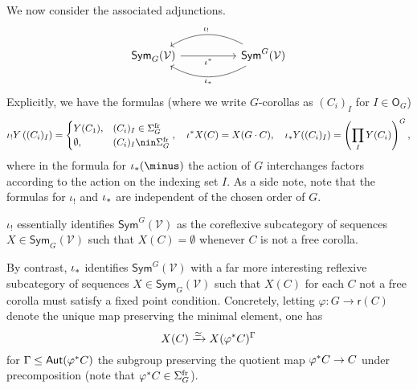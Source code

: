 \documentclass[a4paper,10pt]{article}%
\begin{document}
We now consider the associated adjunctions.
\begin{equation}\label{TWOADJOINTS EQ}
\begin{tikzcd}[column sep =5em]
	\mathsf{Sym}_G(\mathcal{V}) \ar{r}[swap]{\iota^{\**}} 
	&
	\mathsf{Sym}^G(\mathcal{V})
	\ar[bend right]{l}[swap,midway]{\iota_{!}}
	\ar[bend left]{l}{\iota_{\**}}
\end{tikzcd}
\end{equation}
Explicitly, we have the formulas (where we write $G$-corollas as $(C_i)_{I}$ for $I \in \mathsf{O}_G$)
\[
	\iota_!Y\left( (C_i)_I \right)=
	\begin{cases}
	Y(C_1), & (C_i)_I \in \Sigma_G^{\text{fr}} \\
	\emptyset, & (C_i)_I \nin \Sigma_G^{\text{fr}}
	\end{cases},
\quad
	\iota^{\**}X (C) = X(G \cdot C),
\quad
	\iota_{\**}Y ((C_i)_I)=
	\left(\prod_{I} Y(C_i)\right)^G,
\]
where in the formula for $\iota_{\**}(\minus)$
the action of $G$ interchanges factors according to the action on the indexing set $I$.
As a side note, note that the formulas for $\iota_!$ and $\iota_{\**}$ are independent of the chosen order of $G$.

\begin{remark}\label{REFLCOREFL REM}
	$\iota_!$ essentially identifies 
	$\mathsf{Sym}^G(\mathcal{V})$ as the coreflexive subcategory of sequences 
	$X \in \mathsf{Sym}_G(\mathcal{V})$ such that $X(C)=\emptyset$ whenever $C$ is not a free corolla.

By contrast, $\iota_{\**}$ identifies 
$\mathsf{Sym}^G(\mathcal{V})$ with a far more interesting reflexive subcategory of sequences 
$X \in \mathsf{Sym}_G(\mathcal{V})$ 
such that $X(C)$ for each $C$ not a free corolla must satisfy a fixed point condition. Concretely, letting 
$\varphi \colon G \to \mathsf{r}(C)$
denote the unique map preserving the minimal element, one has
\[X(C) \xrightarrow{\simeq} X(\varphi^{\**}C)^{\Gamma}\]
for 
$\Gamma \leq \mathsf{Aut}(\varphi^{\**}C)$
the subgroup preserving the quotient map
$\varphi^{\**}C \to C$
under precomposition (note that $\varphi^{\**}C \in \Sigma_G^{\text{fr}}$).
\end{remark}
\end{document}
